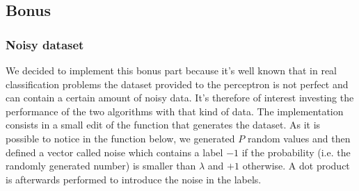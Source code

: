 \subsection{Bonus}
\subsubsection{Noisy dataset}
We decided to implement this bonus part because it's well known that in real classification problems the dataset provided to the perceptron is not perfect and can contain a certain
amount of noisy data. It's therefore of interest investing the performance of the two algorithms with that kind of data. The implementation consists in a small edit of the function
that generates the dataset. As it is possible to notice in the function below, we generated $P$ random values and then defined a vector called noise which contains
a label $-1$ if the probability (i.e. the randomly generated number) is smaller than $\lambda$ and $+1$ otherwise. A dot product is afterwards performed to introduce the noise in
the labels.
